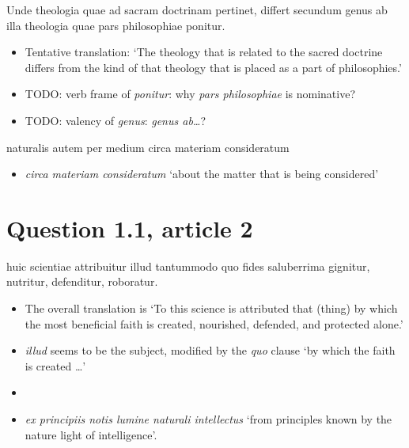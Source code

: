 \documentclass[a4paper, 12pt]{article}
\newcommand{\form}[1]{\emph{#1}}
\newcommand{\translate}[1]{`#1'}
\begin{document}
\begin{exe}
    \ex Unde theologia quae ad sacram doctrinam pertinet, differt secundum genus ab illa theologia quae pars philosophiae ponitur.
\end{exe}

\begin{itemize}
    \item Tentative translation: \translate{The theology that is related to the sacred doctrine differs 
    from the kind of that theology that is placed as a part of philosophies.}
    \item TODO: verb frame of \form{ponitur}: why \form{pars philosophiae} is nominative?
    \item TODO: valency of \form{genus}: \form{genus ab\dots}?
\end{itemize}

\begin{exe}
    \ex naturalis autem per medium circa materiam consideratum 
\end{exe}

\begin{itemize}
    \item \form{circa materiam consideratum} \translate{about the matter that is being considered}
\end{itemize}

\section{Question 1.1, article 2}

\begin{exe}
    \ex huic scientiae attribuitur illud tantummodo quo fides saluberrima gignitur, nutritur, defenditur, roboratur. 
\end{exe}

\begin{itemize}
    \item The overall translation is 
    \translate{To this science is attributed that (thing) by which the most beneficial faith is created, nourished, defended, and protected alone.}
    \item \form{illud} seems to be the subject, modified by the \form{quo} clause \translate{by which the faith is created \dots}
    \item 
\end{itemize}

\begin{itemize}
    \item \form{ex principiis notis lumine naturali intellectus} \translate{from principles known by the nature light of intelligence}.
\end{itemize}
\end{document}
